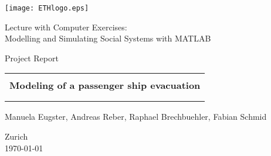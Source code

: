 
\thispagestyle{empty}

\begin{center}
\texttt{[image: ETHlogo.eps]}

\bigskip


\bigskip


\bigskip


\LARGE{ 	Lecture with Computer Exercises:\\ }
\LARGE{ Modelling and Simulating Social Systems with MATLAB\\}

\bigskip

\bigskip

\small{Project Report}\\

\bigskip

\bigskip

\bigskip

\bigskip


\begin{tabular}{|c|}
\hline
\\
\textbf{\LARGE{Modeling of a passenger ship evacuation}}\\
\textbf{\LARGE{}}\\
\\
\hline
\end{tabular}
\bigskip

\bigskip

\bigskip

\LARGE{Manuela Eugster, Andreas Reber, Raphael Brechbuehler, Fabian Schmid }



\bigskip

\bigskip

\bigskip

\bigskip

\bigskip

\bigskip

\bigskip

\bigskip

Zurich\\
\today

\end{center}



